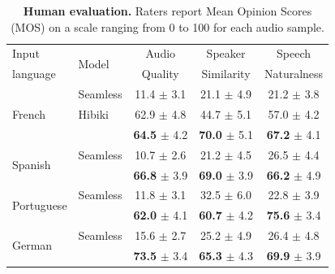 \begin{table}[t]
    \caption{\textbf{Human evaluation.} Raters report Mean Opinion Scores (MOS) on a scale ranging from 0 to 100 for each audio sample.}
    \label{tab:human_eval}
    \begin{center}
    \begin{scriptsize}
    \begin{sc}
    \begin{tabular}{@{}ll@{\hspace{5pt}}c@{\hspace{5pt}}c@{\hspace{5pt}}c@{}}
    \toprule
    Input    & \multirow{2}{*}{Model} & Audio   & Speaker    & Speech \\
    language &                        & Quality & Similarity & Naturalness \\
    \midrule
    \multirow{3}{*}{French} & Seamless & 11.4 $\pm$ 3.1 & 21.1 $\pm$ 4.9 & 21.2 $\pm$ 3.8 \\
                            & Hibiki & 62.9 $\pm$ 4.8 & 44.7 $\pm$ 5.1 & 57.0 $\pm$ 4.2 \\
                            & \ours{} & \textbf{64.5} $\pm$ 4.2 & \textbf{70.0} $\pm$ 5.1 & \textbf{67.2} $\pm$ 4.1 \\
    \midrule
    \multirow{2}{*}{Spanish} & Seamless & 10.7 $\pm$ 2.6 & 21.2 $\pm$ 4.5 & 26.5 $\pm$ 4.4 \\
                             & \ours{} & \textbf{66.8} $\pm$ 3.9 & \textbf{69.0} $\pm$ 3.9 & \textbf{66.2} $\pm$ 4.9 \\
    \midrule
    \multirow{2}{*}{Portuguese} & Seamless & 11.8 $\pm$ 3.1 & 32.5 $\pm$ 6.0 & 22.8 $\pm$ 3.9 \\
                                & \ours{} & \textbf{62.0} $\pm$ 4.1 & \textbf{60.7} $\pm$ 4.2 & \textbf{75.6} $\pm$ 3.4 \\
    \midrule
    \multirow{2}{*}{German} & Seamless & 15.6 $\pm$ 2.7 & 25.2 $\pm$ 4.9 & 26.4 $\pm$ 4.8 \\
                            & \ours{} & \textbf{73.5} $\pm$ 3.4 & \textbf{65.3} $\pm$ 4.3 & \textbf{69.9} $\pm$ 3.9 \\
    \bottomrule
    \end{tabular}
    \end{sc}
    \end{scriptsize}
    \end{center}
\end{table}


